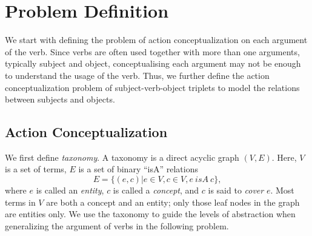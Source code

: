 

\section{Problem Definition}
\label{sec:problem}
We start with defining the problem of action 
conceptualization on each argument of the verb. Since 
verbs are often used together with more than one arguments, 
typically subject and object, 
conceptualising each argument may not be enough to understand
the usage of the verb. 
Thus, we further define the action conceptualization problem 
of subject-verb-object triplets to model the relations between subjects
and objects.

\subsection{Action Conceptualization}
We first define {\em taxonomy}.
A taxonomy is a direct acyclic graph $(V, E)$.
Here, $V$ is a set of terms, $E$ is a set of binary ``isA'' relations
\[E=\{(e,c)| e\in V, c\in V, e~ isA~ c\},\]
where $e$ is called an {\em entity},
$c$ is called a {\em concept}, and $c$ is said to {\em cover} $e$.
Most terms in $V$ are
both a concept and an entity; only those leaf nodes in the graph are
entities only. We use the taxonomy to guide the levels of
abstraction when generalizing the argument of verbs in the following
problem.

